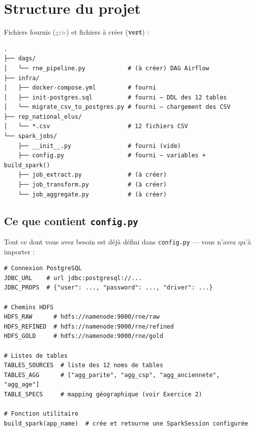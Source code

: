 \documentclass[11pt,a4paper]{article}
\begin{document}
\section{Structure du projet}

Fichiers fournis (\textcolor{gray}{gris}) et fichiers à créer (\textcolor{vertTP}{\textbf{vert}}) :

\begin{lstlisting}[style=bash, numbers=none]
.
├── dags/
│   └── rne_pipeline.py            # (à créer) DAG Airflow
├── infra/
│   ├── docker-compose.yml         # fourni
│   ├── init-postgres.sql          # fourni — DDL des 12 tables
│   └── migrate_csv_to_postgres.py # fourni — chargement des CSV
├── rep_national_elus/
│   └── *.csv                      # 12 fichiers CSV
└── spark_jobs/
    ├── __init__.py                # fourni (vide)
    ├── config.py                  # fourni — variables + build_spark()
    ├── job_extract.py             # (à créer)
    ├── job_transform.py           # (à créer)
    └── job_aggregate.py           # (à créer)
\end{lstlisting}

\subsection*{Ce que contient \texttt{config.py}}

Tout ce dont vous avez besoin est déjà défini dans \texttt{config.py} — vous n'avez qu'à importer :

\begin{lstlisting}
# Connexion PostgreSQL
JDBC_URL    # url jdbc:postgresql://...
JDBC_PROPS  # {"user": ..., "password": ..., "driver": ...}

# Chemins HDFS
HDFS_RAW      # hdfs://namenode:9000/rne/raw
HDFS_REFINED  # hdfs://namenode:9000/rne/refined
HDFS_GOLD     # hdfs://namenode:9000/rne/gold

# Listes de tables
TABLES_SOURCES  # liste des 12 noms de tables
TABLES_AGG      # ["agg_parite", "agg_csp", "agg_anciennete", "agg_age"]
TABLE_SPECS     # mapping géographique (voir Exercice 2)

# Fonction utilitaire
build_spark(app_name)  # crée et retourne une SparkSession configurée
\end{lstlisting}

\end{document}
